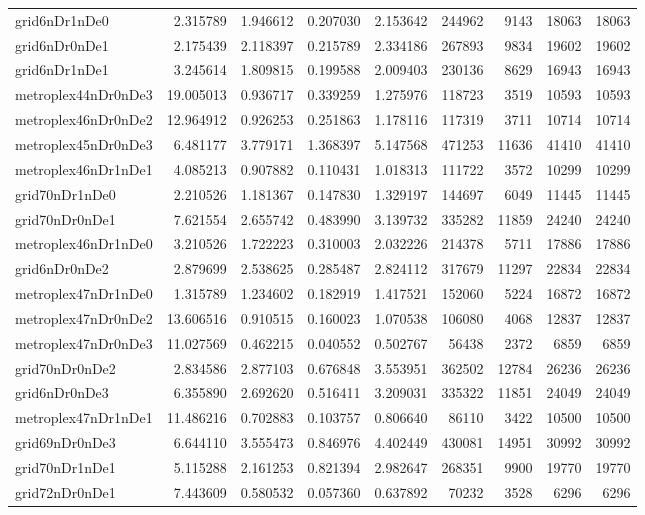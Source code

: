 \documentclass[../../../thesis.tex]{subfiles}
\begin{document}
\begin{longtable}{|l|r|r|r|r|r|r|r|r|}
grid6nDr1nDe0 & 2.315789 & 1.946612 & 0.207030 & 2.153642 & 244962 & 9143 & 18063 & 18063 \\
grid6nDr0nDe1 & 2.175439 & 2.118397 & 0.215789 & 2.334186 & 267893 & 9834 & 19602 & 19602 \\
grid6nDr1nDe1 & 3.245614 & 1.809815 & 0.199588 & 2.009403 & 230136 & 8629 & 16943 & 16943 \\
metroplex44nDr0nDe3 & 19.005013 & 0.936717 & 0.339259 & 1.275976 & 118723 & 3519 & 10593 & 10593 \\
metroplex46nDr0nDe2 & 12.964912 & 0.926253 & 0.251863 & 1.178116 & 117319 & 3711 & 10714 & 10714 \\
metroplex45nDr0nDe3 & 6.481177 & 3.779171 & 1.368397 & 5.147568 & 471253 & 11636 & 41410 & 41410 \\
metroplex46nDr1nDe1 & 4.085213 & 0.907882 & 0.110431 & 1.018313 & 111722 & 3572 & 10299 & 10299 \\
grid70nDr1nDe0 & 2.210526 & 1.181367 & 0.147830 & 1.329197 & 144697 & 6049 & 11445 & 11445 \\
grid70nDr0nDe1 & 7.621554 & 2.655742 & 0.483990 & 3.139732 & 335282 & 11859 & 24240 & 24240 \\
metroplex46nDr1nDe0 & 3.210526 & 1.722223 & 0.310003 & 2.032226 & 214378 & 5711 & 17886 & 17886 \\
grid6nDr0nDe2 & 2.879699 & 2.538625 & 0.285487 & 2.824112 & 317679 & 11297 & 22834 & 22834 \\
metroplex47nDr1nDe0 & 1.315789 & 1.234602 & 0.182919 & 1.417521 & 152060 & 5224 & 16872 & 16872 \\
metroplex47nDr0nDe2 & 13.606516 & 0.910515 & 0.160023 & 1.070538 & 106080 & 4068 & 12837 & 12837 \\
metroplex47nDr0nDe3 & 11.027569 & 0.462215 & 0.040552 & 0.502767 & 56438 & 2372 & 6859 & 6859 \\
grid70nDr0nDe2 & 2.834586 & 2.877103 & 0.676848 & 3.553951 & 362502 & 12784 & 26236 & 26236 \\
grid6nDr0nDe3 & 6.355890 & 2.692620 & 0.516411 & 3.209031 & 335322 & 11851 & 24049 & 24049 \\
metroplex47nDr1nDe1 & 11.486216 & 0.702883 & 0.103757 & 0.806640 & 86110 & 3422 & 10500 & 10500 \\
grid69nDr0nDe3 & 6.644110 & 3.555473 & 0.846976 & 4.402449 & 430081 & 14951 & 30992 & 30992 \\
grid70nDr1nDe1 & 5.115288 & 2.161253 & 0.821394 & 2.982647 & 268351 & 9900 & 19770 & 19770 \\
grid72nDr0nDe1 & 7.443609 & 0.580532 & 0.057360 & 0.637892 & 70232 & 3528 & 6296 & 6296 \\

\end{longtable}
\end{document}
